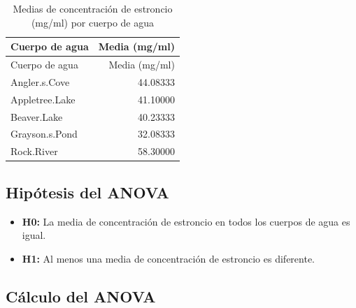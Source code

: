 \documentclass[
]{article}
\newenvironment{Shaded}{\begin{snugshade}}{\end{snugshade}}
\newcommand{\AttributeTok}[1]{\textcolor[rgb]{0.13,0.29,0.53}{#1}}
\newcommand{\FunctionTok}[1]{\textcolor[rgb]{0.13,0.29,0.53}{\textbf{#1}}}
\newcommand{\NormalTok}[1]{#1}
\newcommand{\OtherTok}[1]{\textcolor[rgb]{0.56,0.35,0.01}{#1}}
\newcommand{\SpecialCharTok}[1]{\textcolor[rgb]{0.81,0.36,0.00}{\textbf{#1}}}
\newcommand{\StringTok}[1]{\textcolor[rgb]{0.31,0.60,0.02}{#1}}
\providecommand{\tightlist}{%
  \setlength{\itemsep}{0pt}\setlength{\parskip}{0pt}}
\begin{document}
\begin{Shaded}
\end{Shaded}

\begin{longtable}[]{@{}lr@{}}
\caption{Medias de concentración de estroncio (mg/ml) por cuerpo de
agua}\tabularnewline
\toprule\noalign{}
Cuerpo de agua & Media (mg/ml) \\
\midrule\noalign{}
\endfirsthead
\toprule\noalign{}
Cuerpo de agua & Media (mg/ml) \\
\midrule\noalign{}
\endhead
\bottomrule\noalign{}
\endlastfoot
Angler.s.Cove & 44.08333 \\
Appletree.Lake & 41.10000 \\
Beaver.Lake & 40.23333 \\
Grayson.s.Pond & 32.08333 \\
Rock.River & 58.30000 \\
\end{longtable}

\subsection{Hipótesis del ANOVA}\label{hipuxf3tesis-del-anova}

\begin{itemize}
\tightlist
\item
  \textbf{H0:} La media de concentración de estroncio en todos los
  cuerpos de agua es igual.
\item
  \textbf{H1:} Al menos una media de concentración de estroncio es
  diferente.
\end{itemize}

\subsection{Cálculo del ANOVA}\label{cuxe1lculo-del-anova}
\end{document}
